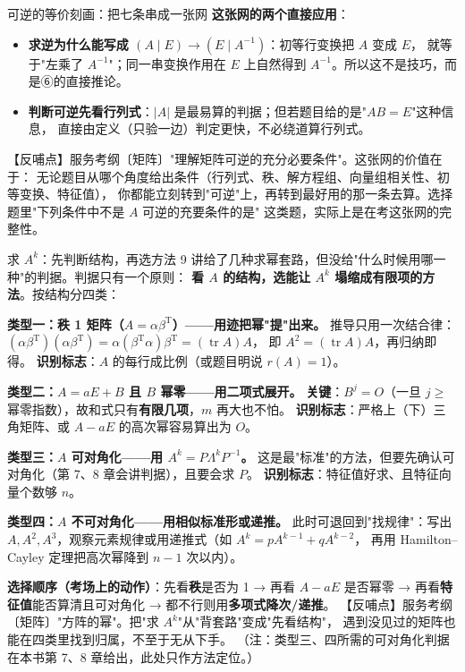 \begin{fdeep}{可逆的等价刻画：把七条串成一张网}
\medskip
\textbf{这张网的两个直接应用}：
\begin{itemize}[leftmargin=2.2em,itemsep=0.22em]
\item \textbf{求逆为什么能写成 $(A\mid E)\to(E\mid A^{-1})$}：初等行变换把 $A$ 变成 $E$，
      就等于"左乘了 $A^{-1}$"；同一串变换作用在 $E$ 上自然得到 $A^{-1}$。所以这不是技巧，而是⑥的直接推论。
\item \textbf{判断可逆先看行列式}：$|A|$ 是最易算的判据；但若题目给的是"$AB=E$"这种信息，
      直接由定义（只验一边）判定更快，不必绕道算行列式。
\end{itemize}
【反哺点】服务考纲〔矩阵〕"理解矩阵可逆的充分必要条件"。这张网的价值在于：
无论题目从哪个角度给出条件（行列式、秩、解方程组、向量组相关性、初等变换、特征值），
你都能立刻转到"可逆"上，再转到最好用的那一条去算。选择题里"下列条件中不是 $A$ 可逆的充要条件的是"
这类题，实际上是在考这张网的完整性。
\end{fdeep}

\begin{fdeep}{求 $A^{k}$：先判断结构，再选方法}
9 讲给了几种求幂套路，但没给"什么时候用哪一种"的判据。判据只有一个原则：
\textbf{看 $A$ 的结构，选能让 $A^{k}$ 塌缩成有限项的方法}。按结构分四类：

\textbf{类型一：秩 1 矩阵（$A=\alpha\beta^{\mathrm{T}}$）——用迹把幂"提"出来。}
推导只用一次结合律：$(\alpha\beta^{\mathrm{T}})(\alpha\beta^{\mathrm{T}})
=\alpha(\beta^{\mathrm{T}}\alpha)\beta^{\mathrm{T}}=(\operatorname{tr}A)A$，
即 $A^{2}=(\operatorname{tr}A)A$，再归纳即得。
\textbf{识别标志}：$A$ 的每行成比例（或题目明说 $r(A)=1$）。

\textbf{类型二：$A=aE+B$ 且 $B$ 幂零——用二项式展开。}
\textbf{关键}：$B^{j}=O$（一旦 $j\ge$ 幂零指数），故和式只有\textbf{有限几项}，$m$ 再大也不怕。
\textbf{识别标志}：严格上（下）三角矩阵、或 $A-aE$ 的高次幂容易算出为 $O$。

\textbf{类型三：$A$ 可对角化——用 $A^{k}=P\Lambda^{k}P^{-1}$。}
这是最"标准"的方法，但要先确认可对角化（第 7、8 章会讲判据），且要会求 $P$。
\textbf{识别标志}：特征值好求、且特征向量个数够 $n$。

\textbf{类型四：$A$ 不可对角化——用相似标准形或递推。}
此时可退回到"找规律"：写出 $A,A^{2},A^{3}$，观察元素规律或用递推式（如 $A^{k}=pA^{k-1}+qA^{k-2}$，
再用 Hamilton–Cayley 定理把高次幂降到 $n-1$ 次以内）。

\medskip
\textbf{选择顺序（考场上的动作）}：先看\textbf{秩}是否为 1 → 再看 $A-aE$ 是否幂零 →
再看\textbf{特征值}能否算清且可对角化 → 都不行则用\textbf{多项式降次/递推}。
【反哺点】服务考纲〔矩阵〕"方阵的幂"。把"求 $A^{k}$"从"背套路"变成"先看结构"，
遇到没见过的矩阵也能在四类里找到归属，不至于无从下手。
（注：类型三、四所需的可对角化判据在本书第 7、8 章给出，此处只作方法定位。）
\end{fdeep}

